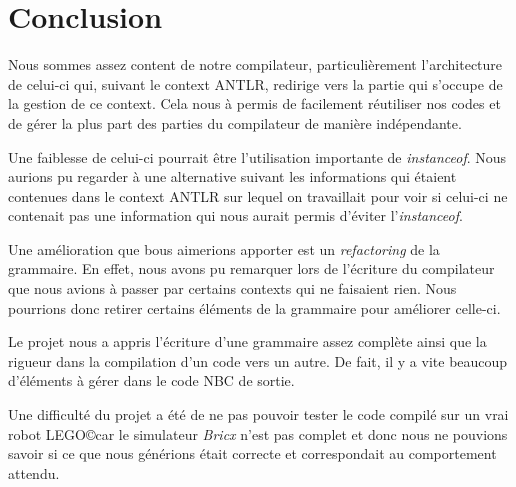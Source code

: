 \section{Conclusion}


Nous sommes assez content de notre compilateur, particulièrement l'architecture de celui-ci qui, suivant le context ANTLR, redirige vers la partie qui s'occupe de la gestion de ce context. Cela nous à permis de facilement réutiliser nos codes et de gérer la plus part des parties du compilateur de manière indépendante.

Une faiblesse de celui-ci pourrait être l'utilisation importante de \emph{instanceof}. Nous aurions pu regarder à une alternative suivant les informations qui étaient contenues dans le context ANTLR sur lequel on travaillait pour voir si celui-ci ne contenait pas une information qui nous aurait permis d'éviter l'\emph{instanceof}.

 Une amélioration que bous aimerions apporter est un \emph{refactoring} de la grammaire. En effet, nous avons pu remarquer lors de l'écriture du compilateur que nous avions à passer par certains contexts qui ne faisaient rien. Nous pourrions donc retirer certains éléments de la grammaire pour améliorer celle-ci.
 
 Le projet nous a appris l'écriture d'une grammaire assez complète ainsi que la rigueur dans la compilation d'un code vers un autre. De fait, il y a vite beaucoup d'éléments à gérer dans le code NBC de sortie.
 
 Une difficulté du projet a été de ne pas pouvoir tester le code compilé sur un vrai robot LEGO\copyright car le simulateur \emph{Bricx} n'est pas complet et donc nous ne pouvions savoir si ce que nous générions était correcte et correspondait au comportement attendu. 
